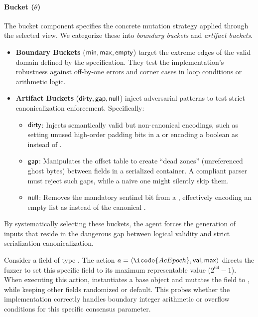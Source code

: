 \paragraph{Bucket ($\theta$)}
The bucket component specifies the concrete mutation strategy applied through the selected view. We categorize these into \emph{boundary buckets} and \emph{artifact buckets}.
\begin{itemize}
    \item \textbf{Boundary Buckets} (${\sf min}, {\sf max}, {\sf empty}$) target the extreme edges of the valid domain defined by the specification. They test the implementation's robustness against off-by-one errors and corner cases in loop conditions or arithmetic logic.
    \item \textbf{Artifact Buckets} (${\sf dirty}, {\sf gap}, {\sf null}$) inject adversarial patterns to test strict canonicalization enforcement. Specifically:
    \begin{itemize}
        \item ${\sf dirty}$: Injects semantically valid but non-canonical encodings, such as setting unused high-order padding bits in a  or encoding a boolean  as  instead of .
        \item ${\sf gap}$: Manipulates the offset table to create ``dead zones'' (unreferenced ghost bytes) between fields in a serialized container. A compliant parser must reject such gaps, while a naive one might silently skip them.
        \item ${\sf null}$: Removes the mandatory sentinel bit from a , effectively encoding an empty list as  instead of the canonical .
    \end{itemize}
\end{itemize}
By systematically selecting these buckets, the agent forces the generation of inputs that reside in the dangerous gap between logical validity and strict serialization canonicalization.


\begin{example}
Consider a field  of type . The action $a = \langle \icode{AcEpoch}, {\sf val}, {\sf max} \rangle$ directs the fuzzer to set this specific field to its maximum representable value ($2^{64}-1$). When executing this action, \tool instantiates a base object and mutates the  field to , while keeping other fields randomized or default. This probes whether the implementation correctly handles boundary integer arithmetic or overflow conditions for this specific consensus parameter.
\end{example}

